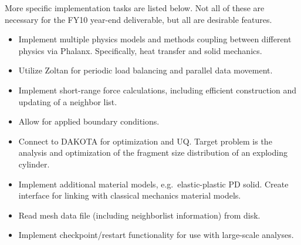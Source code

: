 \documentclass[10pt]{article}
\theoremstyle{plain}
\theoremstyle{definition}
\begin{document}
More specific implementation tasks are listed below. Not all of these are necessary for the FY10 year-end deliverable, but all are desirable features.
\begin{itemize}
  \item Implement multiple physics models and methods coupling between different physics via Phalanx. Specifically, heat transfer and solid mechanics.
  \item Utilize Zoltan for periodic load balancing and parallel data movement.
  \item Implement short-range force calculations, including efficient construction and updating of a neighbor list.
  \item Allow for applied boundary conditions.
  \item Connect to DAKOTA for optimization and UQ.  Target problem is the analysis and optimization of the fragment size distribution of an exploding cylinder.
  \item Implement additional material models, e.g.~elastic-plastic PD solid.  Create interface for linking with classical mechanics material models.
  \item Read mesh data file (including neighborlist information) from disk.
  \item Implement checkpoint/restart functionality for use with large-scale analyses.
\end{itemize}
\end{document}
